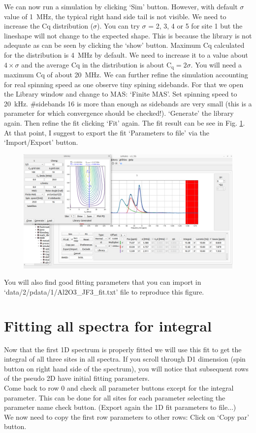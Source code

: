 \documentclass[11pt,a4paper]{article}
\begin{document}
We can now run a simulation by clicking `Sim' button. However, with default $\sigma$ value of 1~MHz, the typical right hand side tail is not visible. 
We need to increase the $\mathrm{Cq}$ distribution ($\sigma$). You can try $\sigma$ = 2, 3, 4 or 5 for site 1 but the lineshape will not change to the expected shape.
This is because the library is not adequate as can be seen by clicking the `show' button. Maximum $\mathrm{Cq}$ calculated for the distribution is 4~MHz by default. 
We need to increase it to a value about $4\times\sigma$ and the average Cq in the distribution is about $\mathrm{C_q} = 2 \sigma$. 
You will need a maximum  $\mathrm{Cq}$ of about 20~MHz.
We can further refine the simulation accounting for real spinning speed as one observe tiny spining sidebands. For that we open the Library window and change to MAS: 
`Finite MAS'. Set spinning speed to 20~kHz. \#sidebands 16 is more than enough as sidebands are very small (this is a parameter for which convergence should be checked!).
`Generate' the library again. Then refine the fit clicking `Fit' again. The fit result can
be see in Fig. \ref{fig:FinalFit_1D}. At that point, I suggest to export the fit `Parameters to file' via the `Import/Export' button.

\begin{figure}[h!]
\includegraphics[width=0.8\linewidth]{Figs/FinalFit_1D.png}
\caption{}
\label{fig:FinalFit_1D}
\end{figure}

You will also find good fitting parameters that you can import in `data/2/pdata/1/Al2O3\_JF3\_fit.txt' file to reproduce this figure.

\section{Fitting all spectra for integral}
Now that the first 1D spectrum is properly fitted we will use this fit to get the integral of all three sites in all spectra. 
If you scroll through D1 dimension (spin button on right hand side of the spectrum), you will notice that subsequent rows of the pseudo 2D have initial fitting parameters.\\ 
Come back to row 0 and check all parameter buttons except for the integral parameter. This can be done for all sites for each parameter selecting the parameter name check button. 
(Export again the 1D fit parameters to file...)\\
We now need to copy the first row parameters to other rows: 
Click on `Copy par' button.
\end{document}
